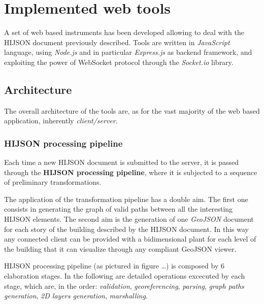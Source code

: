 \documentclass[]{article}
\begin{document}
\section{Implemented web tools}\label{implemented-web-tools}

A set of web based instruments has been developed allowing to deal with
the HIJSON document previously described. Tools are written in
\emph{JavaScript} language, using \emph{Node.js} and in particular
\emph{Express.js} as backend framework, and exploiting the power of
WebSocket protocol through the \emph{Socket.io} library.

\subsection{Architecture}\label{architecture}

The overall architecture of the tools are, as for the vast majority of
the web based application, inherently \emph{client/server}.

\subsubsection{HIJSON processing
pipeline}\label{hijson-processing-pipeline}

Each time a new HIJSON document is submitted to the server, it is passed
through the \textbf{HIJSON processing pipeline}, where it is subjected
to a sequence of preliminary transformations.

The application of the transformation pipeline has a double aim. The
first one consists in generating the graph of valid paths between all
the interesting HIJSON elements. The second aim is the generation of one
\emph{GeoJSON} document for each story of the building described by the
HIJSON document. In this way any connected client can be provided with a
bidimensional plant for each level of the building that it can visualize
through any compliant GeoJSON viewer.

HIJSON processing pipeline (as pictured in figure \ldots{}) is composed
by 6 elaboration stages. In the following are detailed operations
excecuted by each stage, which are, in the order: \emph{validation},
\emph{georeferencing}, \emph{parsing}, \emph{graph paths generation},
\emph{2D layers generation}, \emph{marshalling}.
\end{document}
